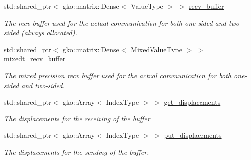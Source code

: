 \begin{DoxyCompactItemize}
std\+::shared\+\_\+ptr$<$ gko\+::matrix\+::\+Dense$<$ Value\+Type $>$ $>$ \hyperlink{structschwz_1_1Communicate_1_1comm__struct_a7b02126d598b9054b9adf0ebc9b3138c}{recv\+\_\+buffer}
\begin{DoxyCompactList}\small\item\em The recv buffer used for the actual communication for both one-\/sided and two-\/sided (always allocated). \end{DoxyCompactList}\item 
\mbox{\label{structschwz_1_1Communicate_1_1comm__struct_a93ca78673122ad09e24bebd0b1ec9750}} 
std\+::shared\+\_\+ptr$<$ gko\+::matrix\+::\+Dense$<$ Mixed\+Value\+Type $>$ $>$ \hyperlink{structschwz_1_1Communicate_1_1comm__struct_a93ca78673122ad09e24bebd0b1ec9750}{mixedt\+\_\+recv\+\_\+buffer}
\begin{DoxyCompactList}\small\item\em The mixed precision recv buffer used for the actual communication for both one-\/sided and two-\/sided. \end{DoxyCompactList}\item 
\mbox{\label{structschwz_1_1Communicate_1_1comm__struct_aa9d510fb291e896fa14fe3e0f00f0454}} 
std\+::shared\+\_\+ptr$<$ gko\+::\+Array$<$ Index\+Type $>$ $>$ \hyperlink{structschwz_1_1Communicate_1_1comm__struct_aa9d510fb291e896fa14fe3e0f00f0454}{get\+\_\+displacements}
\begin{DoxyCompactList}\small\item\em The displacements for the receiving of the buffer. \end{DoxyCompactList}\item 
\mbox{\label{structschwz_1_1Communicate_1_1comm__struct_abb06062ad6fddb9d0399625f4d799d08}} 
std\+::shared\+\_\+ptr$<$ gko\+::\+Array$<$ Index\+Type $>$ $>$ \hyperlink{structschwz_1_1Communicate_1_1comm__struct_abb06062ad6fddb9d0399625f4d799d08}{put\+\_\+displacements}
\begin{DoxyCompactList}\small\item\em The displacements for the sending of the buffer. \end{DoxyCompactList}\item 
\mbox{\label{structschwz_1_1Communicate_1_1comm__struct_a6257c71a7ebf30ecfc390059ceef0e1f}} 

\end{DoxyCompactItemize}
